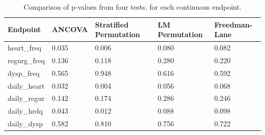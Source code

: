 \documentclass[12pt]{article}
\begin{document}
\begin{table}[]
\centering
\label{tab:clinical_pvalues}
\begin{tabular}{l|LLLL}
Endpoint      & ANCOVA & Stratified Permutation & LM Permutation & Freedman-Lane \\ \hline
heart\_freq   & 0.035                      & 0.006                                                                                & 0.080                                                                        & 0.082                                                                        \\
regurg\_freq  & 0.136                      & 0.118                                                                                & 0.280                                                                        & 0.220                                                                        \\
dysp\_freq    & 0.565                      & 0.948                                                                                & 0.616                                                                        & 0.592                                                                        \\
daily\_heart & 0.032                      & 0.004                                                                                & 0.056                                                                        & 0.068                                                                        \\
daily\_regur  & 0.142                      & 0.174                                                                                & 0.286                                                                        & 0.246                                                                        \\
daily\_hrdq   & 0.043                      & 0.012                                                                                & 0.088                                                                        & 0.098                                                                        \\
daily\_dysp   & 0.582                      & 0.810                                                                                & 0.756                                                                        & 0.722                                                                        \\
\hline
\end{tabular}
\caption{Comparison of p-values from four tests, for each continuous endpoint.} 
\end{table}
\end{document}
